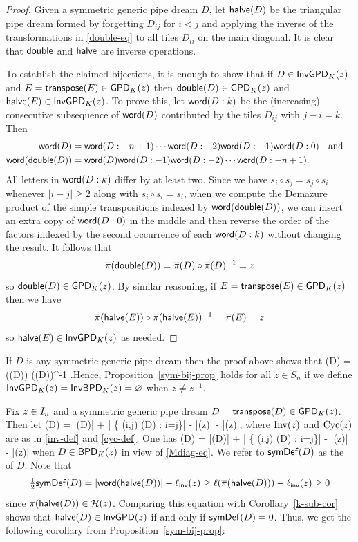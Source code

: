 \documentclass[10pt]{article}
\begin{document}
\begin{proof}
Given a symmetric generic pipe dream $D$, let $\mathsf{halve}(D)$ be the triangular pipe
dream formed by forgetting $D_{ij}$ for $i<j$ and applying the inverse of the transformations in  \eqref{double-eq} to all tiles $D_{ii}$ on the main diagonal.
It is clear that $\mathsf{double}$ and $\mathsf{halve}$ are inverse operations.


To establish the claimed bijections, it is enough to show that if $D \in \mathsf{InvGPD}_K(z)$ and $E=\mathsf{transpose}(E) \in \mathsf{GPD}_K(z)$
then $\mathsf{double}(D) \in \mathsf{GPD}_K(z)$ and $\mathsf{halve}(E) \in \mathsf{InvGPD}_K(z)$.
To prove this, let $\mathsf{word}(D: k)$ be the (increasing) consecutive subsequence of $\mathsf{word}(D)$ contributed by the tiles $D_{ij}$ with $j-i=k$.
Then 
\[
\begin{aligned}
\mathsf{word}(D) &= \mathsf{word}(D:-n+1) \cdots \mathsf{word}(D:-2) \mathsf{word}(D:-1) \mathsf{word}(D:0) \quad\text{and}\quad
\\
\mathsf{word}(\mathsf{double}(D)) &= \mathsf{word}(D) \mathsf{word}(D:-1) \mathsf{word}(D:-2)\cdots \mathsf{word}(D:-n+1).
\end{aligned}
\]
All letters in $\mathsf{word}(D:k)$ differ by at least two. Since we have $s_i \circ s_j = s_j\circ s_i$ whenever $|i-j|\geq 2$ along with $s_i\circ s_i = s_i$,
 when we compute the Demazure product of the simple transpositions indexed by $\mathsf{word}(\mathsf{double}(D))$,
we can insert an extra copy of $\mathsf{word}(D:0) $ in the middle and then reverse the order of the factors indexed by the second occurrence of each $\mathsf{word}(D:k)$ without changing the result. It follows that 
\[\overline{\pi}(\mathsf{double}(D)) = \overline{\pi}(D) \circ \overline{\pi}(D)^{-1} = z\] so $\mathsf{double}(D) \in \mathsf{GPD}_K(z)$.
%
By similar reasoning, if $E=\mathsf{transpose}(E) \in \mathsf{GPD}_K(z)$ then we have \[  \overline{\pi}(\mathsf{halve}(E)) \circ  \overline{\pi}(\mathsf{halve}(E))^{-1} = \overline{\pi}(E) = z\] so $\mathsf{halve}(E) \in \mathsf{InvGPD}_K(z)$
 as needed.
\end{proof}


\begin{remark}
If $D $ is any symmetric generic pipe dream then  the 
proof above shows that 
\be\kpi(D) =  \kpi(\halve(D)) \circ \kpi(\halve(D))^{-1} \in \Invol .\ee Hence, 
Proposition~\ref{sym-bij-prop}  holds for all $z \in S_n$ if we 
define $\mathsf{InvGPD}_K(z)=\mathsf{InvBPD}_K(z) = \varnothing$ when $z \neq z^{-1}$.
\end{remark}

Fix $z \in I_n $ and a symmetric generic pipe dream $D=\mathsf{transpose}(D) \in \mathsf{GPD}_K(z)$. Then let
\be
\symDef(D) = |\cross(D)|  + | \{ (i,j) \in \cross(D) : i=j\}| - |\Inv(z)| - |\Cyc(z)|,
\ee
where $\mathrm{Inv}(z)$ and  $\mathrm{Cyc}(z)$ are as in \eqref{inv-def} and \eqref{cyc-def}. One has
\be
\symDef(D) = |\blank(D)|  + | \{ (i,j) \in \blank(D) : i=j\}| - |\Inv(z)| - |\Cyc(z)|
\ee
when $D \in \mathsf{BPD}_K(z)$ in view of \eqref{Mdiag-eq}.
We refer to $\mathsf{symDef}(D)$ as the  of $D$. Note that
\[
\tfrac{1}{2} \mathsf{symDef}(D) = |\mathsf{word}(\mathsf{halve}(D))| - \ell_{\mathsf{inv}}(z) \geq \ell(\overline{\pi}(\mathsf{halve}(D))) - \ell_{\mathsf{inv}}(z) \geq 0
\]
since $\overline{\pi}(\mathsf{halve}(D)) \in \mathcal H(z)$.
Comparing this equation with Corollary~\ref{k-sub-cor}
shows that $\mathsf{halve}(D) \in \mathsf{InvGPD}(z)$ if and only if $ \mathsf{symDef}(D) = 0$.
Thus, we get the following corollary from Proposition~\ref{sym-bij-prop}:
\end{document}
